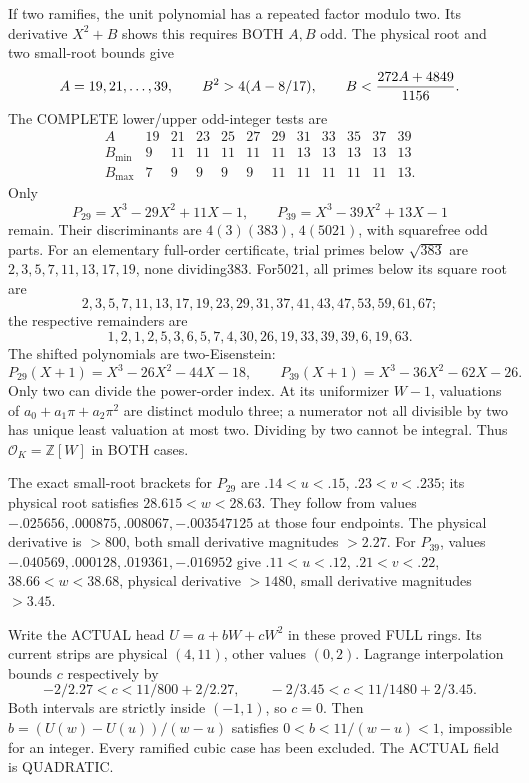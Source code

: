 \documentclass[11pt]{article}
\begin{document}
If two ramifies, the unit polynomial has a
repeated factor modulo two.
Its derivative \(X^2+B\) shows this requires
BOTH \(A,B\) odd.
The physical root and two small-root bounds give
\[
 \begin{gathered}
 A=19,21,\ldots,39,\qquad
 B^2>4(A-8/17),\qquad
 B<{272A+4849\over1156}.
 \end{gathered}
\]
The COMPLETE lower/upper odd-integer tests are
\[
\begin{array}{c|rrrrrrrrrrr}
 A&19&21&23&25&27&29&31&33&35&37&39\\ \hline
 B_{\min}&9&11&11&11&11&11&13&13&13&13&13\\
 B_{\max}&7&9&9&9&9&11&11&11&11&11&13 .
\end{array}
\]
Only
\[
                   P_{29}=X^3-29X^2+11X-1,\qquad
                   P_{39}=X^3-39X^2+13X-1
\]
remain.
Their discriminants are \(4(3)(383)\),
\(4(5021)\), with squarefree odd parts.
For an elementary full-order certificate,
trial primes below \(\sqrt{383}\) are
\(2,3,5,7,11,13,17,19\), none dividing383.
For5021, all primes below its square root are
\[
2,3,5,7,11,13,17,19,23,29,31,37,41,43,47,53,59,61,67;
\]
the respective remainders are
\[
1,2,1,2,5,3,6,5,7,4,30,26,19,33,39,39,6,19,63 .
\]
The shifted polynomials are two-Eisenstein:
\[
 P_{29}(X+1)=X^3-26X^2-44X-18,\qquad
 P_{39}(X+1)=X^3-36X^2-62X-26 .
\]
Only two can divide the power-order index.
At its uniformizer \(W-1\), valuations of
\(a_0+a_1\pi+a_2\pi^2\) are distinct modulo
three; a numerator not all divisible by two
has unique least valuation at most two.
Dividing by two cannot be integral.
Thus \(\mathcal O_K=\mathbb Z[W]\) in BOTH cases.

The exact small-root brackets for \(P_{29}\)
are \(.14<u<.15\), \(.23<v<.235\);
its physical root satisfies \(28.615<w<28.63\).
They follow from values
\(-.025656,.000875,.008067,-.003547125\)
at those four endpoints.
The physical derivative is \(>800\), both
small derivative magnitudes \(>2.27\).
For \(P_{39}\), values
\(-.040569,.000128,.019361,-.016952\)
give \(.11<u<.12\), \(.21<v<.22\),
\(38.66<w<38.68\), physical derivative \(>1480\),
small derivative magnitudes \(>3.45\).

Write the ACTUAL head \(U=a+bW+cW^2\) in
these proved FULL rings.
Its current strips are physical \((4,11)\),
other values \((0,2)\).
Lagrange interpolation bounds \(c\) respectively by
\[
             -2/2.27<c<11/800+2/2.27,\qquad
             -2/3.45<c<11/1480+2/3.45 .
\]
Both intervals are strictly inside \((-1,1)\),
so \(c=0\).
Then \(b=(U(w)-U(u))/(w-u)\) satisfies
\(0<b<11/(w-u)<1\), impossible for an integer.
Every ramified cubic case has been excluded.
The ACTUAL field is QUADRATIC.
\end{document}
